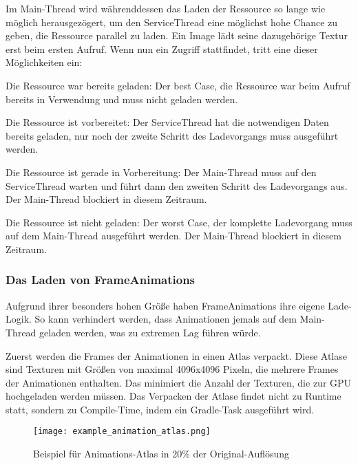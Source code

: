 Im Main-Thread wird währenddessen das Laden der Ressource so lange wie möglich herausgezögert, um den ServiceThread
eine möglichst hohe Chance zu geben, die Ressource parallel zu laden.
Ein Image \zB lädt seine dazugehörige Textur erst beim ersten  Aufruf.
Wenn nun ein Zugriff stattfindet, tritt eine dieser Möglichkeiten ein:

\begin{liste}
    \item Die Ressource war bereits geladen: Der best Case, die Ressource war beim  Aufruf bereits
        in Verwendung und muss nicht geladen werden.
    \item Die Ressource ist vorbereitet: Der ServiceThread hat die notwendigen Daten bereits geladen, nur noch der
        zweite Schritt des Ladevorgangs muss ausgeführt werden.
    \item Die Ressource ist gerade in Vorbereitung: Der Main-Thread muss auf den ServiceThread warten und führt dann
        den zweiten Schritt des Ladevorgangs aus.
        Der Main-Thread blockiert in diesem Zeitraum.
    \item Die Ressource ist nicht geladen: Der worst Case, der komplette Ladevorgang muss auf dem Main-Thread ausgeführt
        werden.
        Der Main-Thread blockiert in diesem Zeitraum.
\end{liste}

\subsubsection{Das Laden von FrameAnimations}

Aufgrund ihrer besonders hohen Größe haben FrameAnimations ihre eigene Lade-Logik.
So kann verhindert werden, dass Animationen jemals auf dem Main-Thread geladen werden, was zu extremen Lag führen würde.

Zuerst werden die Frames der Animationen in einen Atlas verpackt.
Diese Atlase sind Texturen mit Größen von maximal 4096x4096 Pixeln, die mehrere Frames der Animationen enthalten.
Das minimiert die Anzahl der Texturen, die zur GPU hochgeladen werden müssen.
Das Verpacken der Atlase findet nicht zu Runtime statt, sondern zu Compile-Time, indem ein Gradle-Task ausgeführt wird.

\begin{figure}[H]
    \centering
    \texttt{[image: example\_animation\_atlas.png]}
    \caption{Beispiel für Animations-Atlas in 20\% der Original-Auflösung}
\end{figure}

